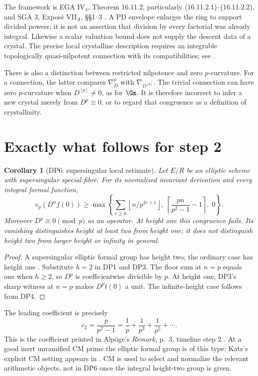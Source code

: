 \documentclass[11pt,a4paper]{article}
\newtheorem{corollary}[theorem]{Corollary}
\theoremstyle{definition}\newtheorem{remark}[theorem]{Remark}
\newcommand{\vp}{v_p}\newcommand{\dR}{\mathrm{dR}}\newcommand{\crys}{\mathrm{crys}}
\newcommand{\ceil}[1]{\left\lceil #1\right\rceil}\newcommand{\floor}[1]{\left\lfloor #1\right\rfloor}
\begin{document}
The framework is EGA IV$_4$, Theorem 16.11.2, particularly (16.11.2.1)--(16.11.2.2), and SGA 3, Expos\'e VII$_A$, \S\S1--3 \cite{EGA,SGA3}. A PD envelope enlarges the ring to support divided powers; it is not an assertion that division by every factorial was already integral. Likewise a scalar valuation bound does not supply the descent data of a crystal. The precise local crystalline description requires an integrable topologically quasi-nilpotent connection with its compatibilities; see \cite[Proposition 60.17.4, tag 07JH]{Stacks}.

There is also a distinction between restricted nilpotence and zero $p$-curvature. For a connection, the latter compares $\nabla_D^p$ with $\nabla_{D^{[p]}}$. The trivial connection can have zero $p$-curvature when $D^{[p]}\ne0$, as for $\Gm$. It is therefore incorrect to infer a new crystal merely from $D^p\equiv0$, or to regard that congruence as a definition of crystallinity.

\section{Exactly what follows for step 2}\label{sec:step2}

\begin{corollary}[DP6: supersingular local estimate]\label{DP6}
Let $E/R$ be an elliptic scheme with supersingular special fibre. For its normalized invariant derivation and every integral formal function,
\begin{equation}\label{eq:h2}
 \vp(D^nf(0))\ge
 \max\left\{\sum_{r\ge0}\floor{n/p^{2r+1}},\;
 \ceil{\frac{pn}{p^2-1}-1},\;0\right\}.
\end{equation}
Moreover $D^p\equiv0\pmod p$ as an operator. At height one this congruence fails. Its vanishing distinguishes height at least two from height one; it does not distinguish height two from larger height or infinity in general.
\end{corollary}
\begin{proof}
A supersingular elliptic formal group has height two; the ordinary case has height one \cite[\S2.1]{Illusie}. Substitute $h=2$ in DP1 and DP3. The floor sum at $n=p$ equals one when $h\ge2$, so $D^p$ is coefficientwise divisible by $p$. At height one, DP3's sharp witness at $n=p$ makes $D^pt(0)$ a unit. The infinite-height case follows from DP4.
\end{proof}

The leading coefficient is precisely
\[
 c_2=\frac p{p^2-1}=\frac1p+\frac1{p^3}+\frac1{p^5}+\cdots.
\]
This is the coefficient printed in Alp\"oge's \emph{Remark}, p.~3, timeline step 2 \cite{Alpoge}. At a good inert unramified CM prime the elliptic formal group is of this type; Katz's explicit CM setting appears in \cite[\S IV, (4.1)--(4.6), pp.~675--676]{Katz81}. CM is used to select and normalize the relevant arithmetic objects, not in DP6 once the integral height-two group is given.
\end{document}
